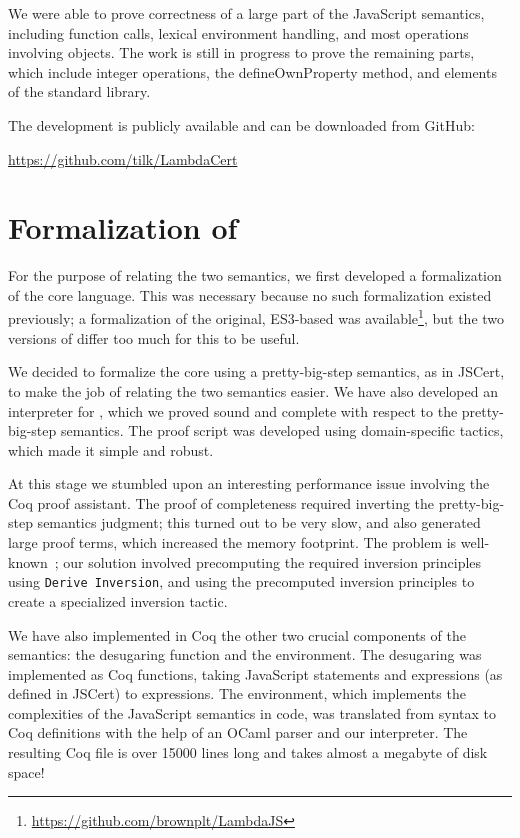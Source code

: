 \documentclass{sigplanconf}
\begin{document}
We were able to prove correctness of a large part of the
JavaScript semantics, including function calls, lexical environment
handling, and most operations involving objects. The work is still
in progress to prove the remaining parts, which include integer
operations, the
defineOwnProperty method, and elements of the standard library.

The development is publicly available and can be downloaded from GitHub:

\url{https://github.com/tilk/LambdaCert}

\section{Formalization of \lambdajs{}}

For the purpose of relating the two semantics, we first
developed a formalization of the \lambdajs{} core language.
This was necessary because no such formalization existed previously;
a formalization of the original, ES3-based \lambdajs{}
was available\footnote{\url{https://github.com/brownplt/LambdaJS}},
but the two versions of \lambdajs{} differ too much for this
to be useful.

We decided to formalize the \lambdajs{} core using a
pretty-big-step semantics, as in JSCert, to make the job of
relating the two semantics easier. We have also developed
an interpreter for \lambdajs{}, which we proved sound and
complete with respect to the pretty-big-step semantics.
The proof script was developed using domain-specific tactics,
which made it simple and robust.

At this stage we stumbled upon an interesting performance issue 
involving the Coq proof assistant. The proof of completeness required
inverting the pretty-big-step semantics judgment; this turned out
to be very slow, and also generated large proof terms, which increased
the memory footprint. The problem is well-known~\cite{Monin:Coq2}; 
our solution involved
precomputing the required inversion principles using
\texttt{Derive Inversion}, and using the precomputed inversion
principles to create a specialized inversion tactic.

We have also implemented in Coq the other two crucial components
of the \lambdajs{} semantics: the desugaring function and the 
environment. The desugaring was implemented as Coq functions,
taking JavaScript statements and expressions (as defined in
JSCert) to \lambdajs{} expressions. The environment, which
implements the complexities of the JavaScript semantics
in \lambdajs{} code, was translated from \lambdajs{} syntax
to Coq definitions with the help of an OCaml parser and
our interpreter. The resulting Coq file is over 15000 lines long
and takes almost a megabyte of disk space!
\end{document}
